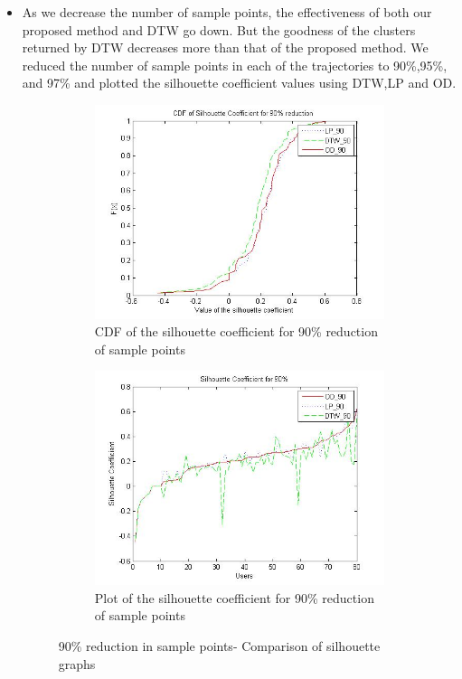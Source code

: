 \begin{itemize}
\item
As we decrease the number of sample points, the effectiveness of both our proposed method and DTW go down. But the goodness of the clusters returned by DTW decreases more than that of the proposed method. We reduced the number of sample points in each of the trajectories to 90\%,95\%, and 97\% and plotted the silhouette coefficient values using DTW,LP and OD. 

\begin{figure}
    \centering
    \begin{subfigure}[t]{.5\textwidth}
        \centering
        \includegraphics[scale=0.4]{figs/noise_90_cdf.jpg}
        \caption{CDF of the silhouette coefficient for 90\% reduction of sample points }
    \end{subfigure}%
	\begin{subfigure}[t]{.5\textwidth}
        \centering
        \includegraphics[scale=0.4]{figs/noise_90_sil.jpg}
        \caption{Plot of the silhouette coefficient for 90\% reduction of sample points}
    \end{subfigure}
     \caption{90\% reduction in sample points- Comparison of silhouette graphs}
    \label{fig:noise_90}    
\end{figure}



\end{itemize}
